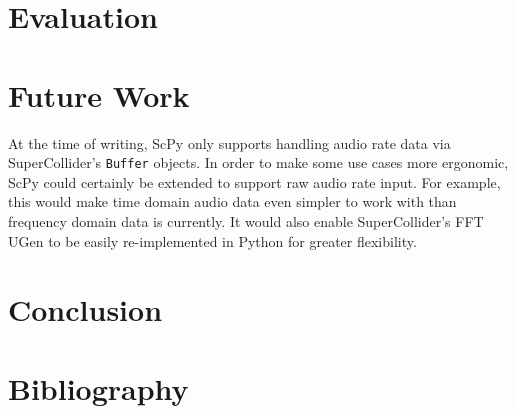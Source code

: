\documentclass{article}
\begin{document}
\section{Evaluation}

\section{Future Work}

At the time of writing, ScPy only supports handling audio rate data via SuperCollider's
\texttt{Buffer} objects. In order to make some use cases more ergonomic, ScPy could certainly be
extended to support raw audio rate input. For example, this would make time domain audio data even
simpler to work with than frequency domain data is currently. It would also enable
SuperCollider's FFT UGen to be easily re-implemented in Python for greater flexibility.

\section{Conclusion}

\section{Bibliography}
\end{document}
